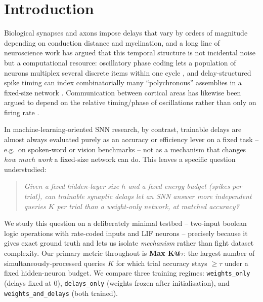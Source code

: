 \documentclass[conference]{IEEEtran}
\begin{document}
\section{Introduction}

Biological synapses and axons impose delays that vary by orders of magnitude depending
on conduction distance and myelination, and a long line of neuroscience work has argued
that this temporal structure is not incidental noise but a computational resource:
oscillatory phase coding lets a population of neurons multiplex several discrete items
within one cycle \cite{lisman1995storage,cowan2001magical}, and delay-structured spike
timing can index combinatorially many ``polychronous'' assemblies in a fixed-size network
\cite{izhikevich2006polychronization}. Communication between cortical areas has likewise
been argued to depend on the relative timing/phase of oscillations rather than only on
firing rate \cite{fries2005mechanism,buzsaki2010neural}.

In machine-learning-oriented SNN research, by contrast, trainable delays are almost
always evaluated purely as an accuracy or efficiency lever on a fixed task -- e.g.\ on
spoken-word or vision benchmarks \cite{hammouamri2024learning,sun2022axonal,%
sun2023adaptive,patino2024colearning} -- not as a mechanism that changes \emph{how much
work} a fixed-size network can do. This leaves a specific question understudied:

\begin{quote}
\emph{Given a fixed hidden-layer size $h$ and a fixed energy budget (spikes per trial),
can trainable synaptic delays let an SNN answer more independent queries $K$ per trial
than a weight-only network, at matched accuracy?}
\end{quote}

We study this question on a deliberately minimal testbed -- two-input boolean logic
operations with rate-coded inputs and LIF neurons -- precisely because it gives exact
ground truth and lets us isolate \emph{mechanism} rather than fight dataset complexity.
Our primary metric throughout is \textbf{Max K@$\tau$}: the largest number of
simultaneously-processed queries $K$ for which trial accuracy stays $\geq\tau$ under a
fixed hidden-neuron budget. We compare three training regimes: \texttt{weights\_only}
(delays fixed at 0), \texttt{delays\_only} (weights frozen after initialisation), and
\texttt{weights\_and\_delays} (both trained).
\end{document}
